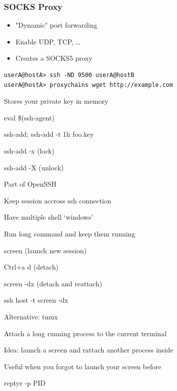 \begin{frame}[fragile]
\frametitle{SOCKS Proxy}
\begin{itemize}
\item "Dynamic" port forwarding
\item Enable UDP, TCP, \dots
\item Creates a SOCKS5 proxy
\end{itemize}
\begin{lstlisting}
userA@hostA> ssh -ND 9500 userA@hostB
userA@hostA> proxychains wget http://example.com
\end{lstlisting}

\end{frame}


\begin{iframe}
\item Stores your private key in memory
\item eval \$(ssh-agent)
\item ssh-add; ssh-add -t 1h foo.key
\item ssh-add -x (lock)
\item ssh-add -X (unlock)
\item Part of OpenSSH
\end{iframe}
\begin{iframe}[screen]
\item Keep session accross ssh connection
\item Have multiple shell `windows'
\item Run long command and keep them running
\item screen (launch new session)
\item Ctrl+a d (detach)
\item screen -dx (detach and reattach)
\item ssh host -t screen -dx
\item Alternative: tmux
\end{iframe}
\begin{iframe}[reptyr]
\item Attach a long running process to the current terminal
\item Idea: launch a screen and rattach another process inside
\item Useful when you forgot to launch your screen before
\item reptyr -p PID
\end{iframe}

